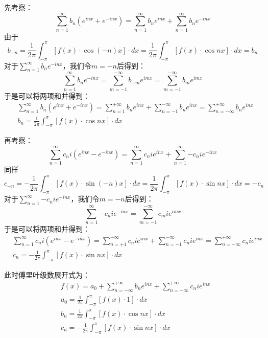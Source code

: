 先考察：
\[
\sum_{n=1}^{\infty}{b_n\left( e^{inx}+e^{-inx} \right)}=\sum_{n=1}^{\infty}{b_ne^{inx}}+\sum_{n=1}^{\infty}{b_ne^{-inx}}
\]
由于
\[
b_{-n}=\frac{1}{2\pi}\int_{-\pi}^{\pi}{\left[ f\left( x \right) \cdot \cos \left( -n \right) x \right] \cdot dx}=\frac{1}{2\pi}\int_{-\pi}^{\pi}{\left[ f\left( x \right) \cdot \cos nx \right] \cdot dx}=b_n
\]
对于$\sum_{n=1}^{\infty}{b_ne^{-inx}}$，我们令$m=-n$后得到：
\[
\sum_{n=1}^{\infty}{b_ne^{-inx}}=\sum_{m=-1}^{-\infty}{b_{-m}e^{imx}}=\sum_{m=-1}^{-\infty}{b_me^{imx}}
\]
于是可以将两项和并得到：
\begin{align*}
&\sum_{n=1}^{\infty}{b_n\left( e^{inx}+e^{-inx} \right)}=\sum_{n=1}^{+\infty}{b_ne^{inx}}+\sum_{n=-1}^{-\infty}{b_ne^{inx}}=\sum_{n=-\infty}^{+\infty}{b_ne^{inx}} \\
&b_n=\frac{1}{2\pi}\int_{-\pi}^{\pi}{\left[ f\left( x \right) \cdot \cos nx \right] \cdot dx}
\end{align*}

再考察：
\[
\sum_{n=1}^{\infty}{c_ni\left( e^{inx}-e^{-inx} \right)}=\sum_{n=1}^{\infty}{c_nie^{inx}}+\sum_{n=1}^{\infty}{-c_nie^{-inx}}
\]
同样
\[
c_{-n}=-\frac{1}{2\pi}\int_{-\pi}^{\pi}{\left[ f\left( x \right) \cdot \sin \left( -n \right) x \right] \cdot dx}=\frac{1}{2\pi}\int_{-\pi}^{\pi}{\left[ f\left( x \right) \cdot \sin nx \right] \cdot dx}=-c_n
\]
对于$\sum_{n=1}^{\infty}{-c_nie^{-inx}}$，我们令$m=-n$后得到：
\[
\sum_{n=1}^{\infty}{-c_nie^{-inx}}=\sum_{m=-1}^{-\infty}{c_mie^{imx}}
\]
于是可以将两项和并得到：
\begin{align*}
&\sum_{n=1}^{\infty}{c_ni\left( e^{inx}-e^{-inx} \right)}=\sum_{n=+1}^{+\infty}{c_nie^{inx}}+\sum_{n=-1}^{-\infty}{c_nie^{inx}}=\sum_{n=-\infty}^{+\infty}{c_nie^{inx}} \\
&c_n=-\frac{1}{2\pi}\int_{-\pi}^{\pi}{\left[ f\left( x \right) \cdot \sin nx \right] \cdot dx}
\end{align*}

此时傅里叶级数展开式为：
\begin{align*}
&f\left( x \right) =a_0+\sum_{n=-\infty}^{+\infty}{b_ne^{inx}}+\sum_{n=-\infty}^{+\infty}{c_nie^{inx}} \\
&a_0=\frac{1}{2\pi}\int_{-\pi}^{\pi}{\left[ f\left( x \right) \cdot 1 \right] \cdot dx} \\
&b_n=\frac{1}{2\pi}\int_{-\pi}^{\pi}{\left[ f\left( x \right) \cdot \cos nx \right] \cdot dx} \\
&c_n=-\frac{1}{2\pi}\int_{-\pi}^{\pi}{\left[ f\left( x \right) \cdot \sin nx \right] \cdot dx}
\end{align*}

